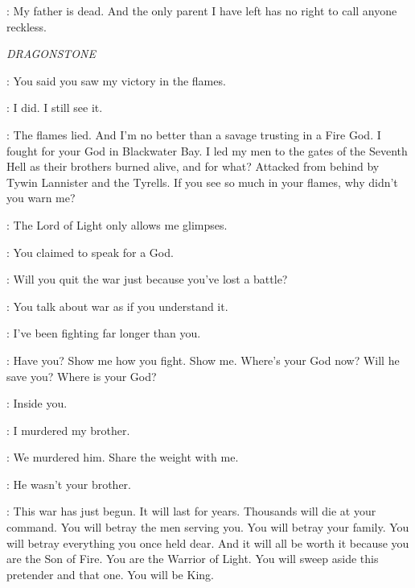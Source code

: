 \ROBB: My father is dead. And the only parent I have left has no right to call anyone reckless.



\scene

\textit{DRAGONSTONE} 


\STANNIS: You said you saw my victory in the flames. 

\MELISANDRE: I did. I still see it. 

\STANNIS: The flames lied. And I'm no better than a savage trusting in a Fire God.  I fought for your God in Blackwater Bay. I led my men to the gates of the Seventh Hell as their brothers burned alive, and for what? Attacked from behind by Tywin Lannister and the Tyrells. If you see so much in your flames, why didn't you warn me? 

\MELISANDRE: The Lord of Light only allows me glimpses. 

\STANNIS: You claimed to speak for a God. 

\MELISANDRE: Will you quit the war just because you've lost a battle? 

\STANNIS: You talk about war as if you understand it. 

\MELISANDRE: I've been fighting far longer than you. 

\STANNIS: Have you? Show me how you fight.  Show me. Where's your God now? Will he save you? Where is your God? 

\MELISANDRE: Inside you. 


\STANNIS: I murdered my brother. 


\MELISANDRE: We murdered him. Share the weight with me. 

\STANNIS: He wasn't your brother. 

\MELISANDRE:  This war has just begun. It will last for years. Thousands will die at your command. You will betray the men serving you. You will betray your family. You will betray everything you once held dear. And it will all be worth it because you are the Son of Fire. You are the Warrior of Light. You will sweep aside this pretender and that one. You will be King. 

